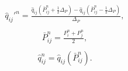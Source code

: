 \documentclass[a4paper,12pt,russian]{extreport}
\begin{document}
%
\begin{eqnarray}
\begin{gathered}
\hat{q}_{ij}'^n = \frac{\hat{q}_{ij}\left(\bar{P}_{ij}^n+ \frac{1}{2}\Delta_P\right)-
\hat{q}_{ij}\left(\bar{P}_{ij}^n-\frac{1}{2}\Delta_P\right)}{{\Delta_P}},
\end{gathered}
\end{eqnarray}
%
\begin{eqnarray}
\begin{gathered}
\bar{P}^{n}_{ij} = \frac{P^n_i+P^n_j}{2}, 
\end{gathered}
\end{eqnarray}
%
\begin{eqnarray}
\begin{gathered}
\hat{q}_{ij}^{n} = \hat{q}_{ij}\left(\bar{P}_{ij}^n\right).
\end{gathered}
\end{eqnarray}
%
\end{document}
